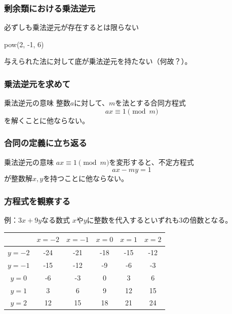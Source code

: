 \documentclass[aspectratio=169,dvipdfmx,14pt,notheorems]{beamer}
\theoremstyle{definition}
\begin{document}
\begin{frame}[fragile]\frametitle{剰余類における乗法逆元}

\begin{alertblock}{必ずしも乗法逆元が存在するとは限らない}

\begin{pyconsole}
pow(2, -1, 6)
\end{pyconsole}
\end{alertblock}
与えられた法に対して底が乗法逆元を持たない（何故？）。
\end{frame}

\begin{frame}[fragile]\frametitle{乗法逆元を求めて}

\begin{block}{乗法逆元の意味}
整数$a$に対して、$m$を法とする合同方程式
\begin{equation*}
ax \equiv 1 \pmod{m}
\end{equation*}
を解くことに他ならない。
\end{block}

\end{frame}

\begin{frame}[fragile]\frametitle{合同の定義に立ち返る}

\begin{block}{乗法逆元の意味}
$ax \equiv 1 \pmod{m}$を変形すると、不定方程式
\begin{equation*}
ax -my = 1
\end{equation*}
が整数解$x, y$を持つことに他ならない。
\end{block}

\end{frame}

\begin{frame}[fragile]\frametitle{方程式を観察する}

\begin{exampleblock}{例：$3x + 9y$なる数式}
$x$や$y$に整数を代入するといずれも3の倍数となる。
\begin{table}[]
\begin{tabular}{|c|c|c|c|c|c|}
\hline
       & $x=-2$ & $x=-1$ & $x=0$ & $x=1$ & $x=2$ \\ \hline
$y=-2$ & -24    & -21    & -18   & -15   & -12   \\ \hline
$y=-1$ & -15    & -12    & -9    & -6    & -3    \\ \hline
$y=0$  & -6     & -3     & 0     & 3     & 6     \\ \hline
$y=1$  & 3      & 6      & 9     & 12    & 15    \\ \hline
$y=2$  & 12     & 15     & 18    & 21    & 24    \\ \hline
\end{tabular}
\end{table}

\end{exampleblock}

\end{frame}
\end{document}

